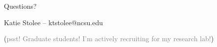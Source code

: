 \begin{frame}
\Huge{\centerline{Questions?}}
\centering
\Large
Katie Stolee -- ktstolee@ncsu.edu

\vspace{24pt}
(\textcolor{gray}{psst! Graduate students! I'm actively recruiting for my research lab!})
\end{frame}



